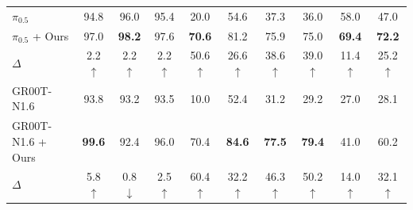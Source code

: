 \begin{table}[t]
{\begin{tabular}{l ccc ccc ccc}
\rowcolor{mygray} \multicolumn{10}{l}{\textit{Controlled comparison}} \\
\midrule
$\pi_{0.5}$~\cite{pi05} & 94.8 & 96.0 & 95.4 & 20.0 & 54.6 & 37.3 & 36.0 & 58.0 & 47.0 \\
\rowcolor{myblue}
$\pi_{0.5}$ + Ours & 97.0 & \textbf{98.2} & 97.6 & \textbf{70.6} & 81.2 & 75.9 & 75.0 & \textbf{69.4} & \textbf{72.2} \\
\rowcolor{myblue}
$\Delta$ & \textcolor{deltagreen}{\footnotesize{2.2 $\uparrow$}} & \textcolor{deltagreen}{\footnotesize{2.2 $\uparrow$}} & \textcolor{deltagreen}{\footnotesize{2.2 $\uparrow$}} & \textcolor{deltagreen}{\footnotesize{50.6 $\uparrow$}} & \textcolor{deltagreen}{\footnotesize{26.6 $\uparrow$}} & \textcolor{deltagreen}{\footnotesize{38.6 $\uparrow$}} & \textcolor{deltagreen}{\footnotesize{39.0 $\uparrow$}} & \textcolor{deltagreen}{\footnotesize{11.4 $\uparrow$}} & \textcolor{deltagreen}{\footnotesize{25.2 $\uparrow$}} \\
\midrule
GR00T-N1.6~\cite{gr00tn1_2025} & 93.8 & 93.2 & 93.5 & 10.0 & 52.4 & 31.2 & 29.2 & 27.0 & 28.1 \\
\rowcolor{myblue}
GR00T-N1.6 + Ours & \textbf{99.6} & 92.4 & 96.0 & 70.4 & \textbf{84.6} & \textbf{77.5} & \textbf{79.4} & 41.0 & 60.2 \\
\rowcolor{myblue}
$\Delta$ & \textcolor{deltagreen}{\footnotesize{5.8 $\uparrow$}} & \textcolor{deltared}{\footnotesize{0.8 $\downarrow$}} & \textcolor{deltagreen}{\footnotesize{2.5 $\uparrow$}} & \textcolor{deltagreen}{\footnotesize{60.4 $\uparrow$}} & \textcolor{deltagreen}{\footnotesize{32.2 $\uparrow$}} & \textcolor{deltagreen}{\footnotesize{46.3 $\uparrow$}} & \textcolor{deltagreen}{\footnotesize{50.2 $\uparrow$}} & \textcolor{deltagreen}{\footnotesize{14.0 $\uparrow$}} & \textcolor{deltagreen}{\footnotesize{32.1 $\uparrow$}} \\
\bottomrule
\end{tabular}
}
\end{table}